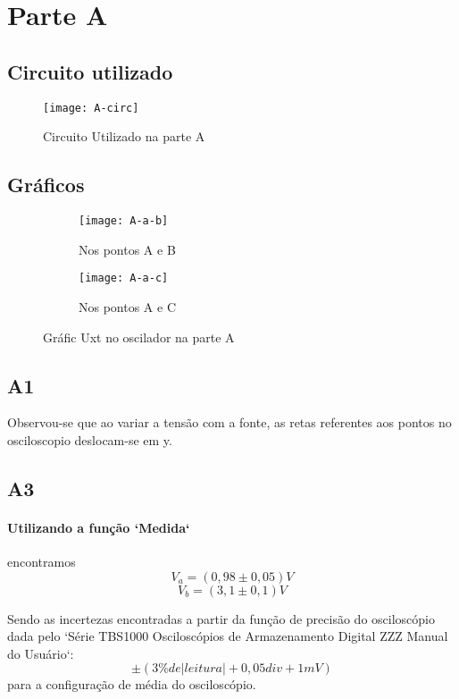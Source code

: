 \section{Parte A}
    \subsection{Circuito utilizado}
        \begin{figure} [H] 
            \texttt{[image: A-circ]}
            \caption{Circuito Utilizado na parte A}
            \label{fig:A-circ}
        \end{figure}
    \subsection{Gráficos}
        \begin{figure} [H] 
            \begin{subfigure}[b]{7cm}  
                \texttt{[image: A-a-b]}
                \caption{Nos pontos A e B}
                \label{fig:A-a-b}
            \end{subfigure}
            \begin{subfigure}[b]{7cm}  
                \texttt{[image: A-a-c]}
                \caption{Nos pontos A e C}
                \label{fig:A-a-c}
            \end{subfigure}
            \caption{Gráfic Uxt no oscilador na parte A}
        \end{figure}
    \subsection{A1}
        Observou-se que ao variar a tensão com a fonte, as retas referentes aos pontos no osciloscopio deslocam-se em y.
    \subsection{A3}
        \paragraph{Utilizando a função `Medida`} encontramos 
        $$V_a = (0,98 \pm 0,05) V$$
        $$V_b = (3,1 \pm 0,1) V$$

        Sendo as incertezas encontradas a partir da função de precisão do osciloscópio dada pelo `Série TBS1000 Osciloscópios de Armazenamento Digital ZZZ Manual do Usuário`:
        $$\pm(3\% de |leitura| + 0,05 div + 1mV)$$
        para a configuração de média do osciloscópio. 
        \newline
        
